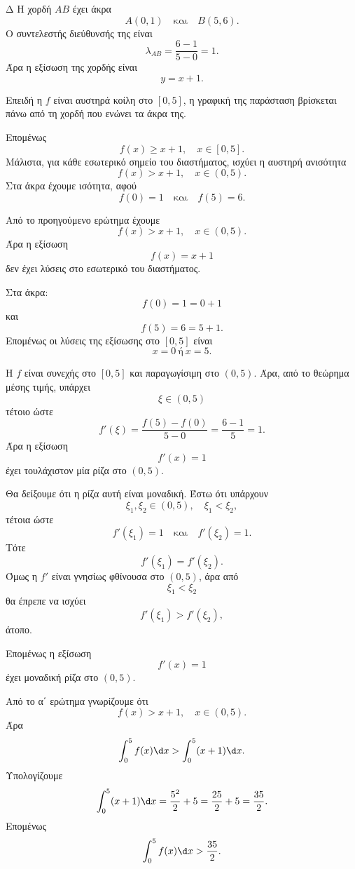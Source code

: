 \begin{thema}{Δ}
Η χορδή $AB$ έχει άκρα
\[
A(0,1)
\quad\text{και}\quad
B(5,6).
\]
Ο συντελεστής διεύθυνσής της είναι
\[
\lambda_{AB}=\frac{6-1}{5-0}=1.
\]
Άρα η εξίσωση της χορδής είναι
\[
y=x+1.
\]

\begin{erwthma}
\item Επειδή η $f$ είναι αυστηρά κοίλη στο $[0,5]$, η γραφική της
παράσταση βρίσκεται πάνω από τη χορδή που ενώνει τα άκρα της.

Επομένως
\[
f(x)\geq x+1,\quad x\in[0,5].
\]
Μάλιστα, για κάθε εσωτερικό σημείο του διαστήματος, ισχύει η αυστηρή
ανισότητα
\[
f(x)>x+1,\quad x\in(0,5).
\]
Στα άκρα έχουμε ισότητα, αφού
\[
f(0)=1
\quad\text{και}\quad
f(5)=6.
\]

\item Από το προηγούμενο ερώτημα έχουμε
\[
f(x)>x+1,\quad x\in(0,5).
\]
Άρα η εξίσωση
\[
f(x)=x+1
\]
δεν έχει λύσεις στο εσωτερικό του διαστήματος.

Στα άκρα:
\[
f(0)=1=0+1
\]
και
\[
f(5)=6=5+1.
\]
Επομένως οι λύσεις της εξίσωσης στο $[0,5]$ είναι
\[
{x=0\ \text{ή}\ x=5}.
\]

\item Η $f$ είναι συνεχής στο $[0,5]$ και παραγωγίσιμη στο $(0,5)$.
Άρα, από το θεώρημα μέσης τιμής, υπάρχει
\[
\xi\in(0,5)
\]
τέτοιο ώστε
\[
f'(\xi)=\frac{f(5)-f(0)}{5-0}
=\frac{6-1}{5}
=1.
\]
Άρα η εξίσωση
\[
f'(x)=1
\]
έχει τουλάχιστον μία ρίζα στο $(0,5)$.

Θα δείξουμε ότι η ρίζα αυτή είναι μοναδική. Έστω ότι υπάρχουν
\[
\xi_1,\xi_2\in(0,5),\quad \xi_1<\xi_2,
\]
τέτοια ώστε
\[
f'(\xi_1)=1
\quad\text{και}\quad
f'(\xi_2)=1.
\]
Τότε
\[
f'(\xi_1)=f'(\xi_2).
\]
Όμως η $f'$ είναι γνησίως φθίνουσα στο $(0,5)$, άρα από
\[
\xi_1<\xi_2
\]
θα έπρεπε να ισχύει
\[
f'(\xi_1)>f'(\xi_2),
\]
άτοπο.

Επομένως η εξίσωση
\[
f'(x)=1
\]
έχει μοναδική ρίζα στο $(0,5)$.

\item Από το α΄ ερώτημα γνωρίζουμε ότι
\[
f(x)>x+1,\quad x\in(0,5).
\]
Άρα
\[
\int_0^5 f(x)\d x
>
\int_0^5 (x+1)\d x.
\]
Υπολογίζουμε
\[
\int_0^5 (x+1)\d x
=\frac{5^2}{2}+5
=\frac{25}{2}+5
=\frac{35}{2}.
\]
Επομένως
\[
{\int_0^5 f(x)\d x>\frac{35}{2}}.
\]
\end{erwthma}
\end{thema}

